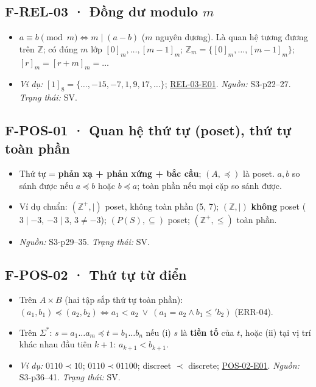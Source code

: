 \documentclass[
  10pt,
  twoside,openany]{book}
\providecommand{\tightlist}{%
  \setlength{\itemsep}{0pt}\setlength{\parskip}{0pt}}
\begin{document}
\hypertarget{F-REL-03}{%
\subsection{\texorpdfstring{F-REL-03 · Đồng dư modulo
\(m\)}{F-REL-03 · Đồng dư modulo m}}\label{F-REL-03}}

\begin{itemize}
\tightlist
\item
  \(a\equiv b\pmod m\Leftrightarrow m\mid(a-b)\) (\(m\) nguyên dương).
  Là quan hệ tương đương trên \(\mathbb Z\); có đúng \(m\) lớp
  \([0]_m,\dots,[m-1]_m\); \(\mathbb Z_m=\{[0]_m,\dots,[m-1]_m\}\);
  \([r]_m=[r+m]_m=\dots\)
\item
  \emph{Ví dụ:} \([1]_8=\{\dots,-15,-7,1,9,17,\dots\}\);
  \protect\hyperlink{REL-03-E01}{REL-03-E01}. \emph{Nguồn:} S3-p22--27.
  \emph{Trạng thái:} SV.
\end{itemize}

\hypertarget{F-POS-01}{%
\subsection{F-POS-01 · Quan hệ thứ tự (poset), thứ tự toàn
phần}\label{F-POS-01}}

\begin{itemize}
\tightlist
\item
  Thứ tự = \textbf{phản xạ + phản xứng + bắc cầu}; \((A,\preceq)\) là
  poset. \(a,b\) so sánh được nếu \(a\preceq b\) hoặc \(b\preceq a\);
  toàn phần nếu mọi cặp so sánh được.
\item
  Ví dụ chuẩn: \((\mathbb Z^+,\mid)\) poset, không toàn phần (5, 7);
  \((\mathbb Z,\mid)\) \textbf{không} poset (\(3\mid-3\), \(-3\mid3\),
  \(3\ne-3\)); \((P(S),\subseteq)\) poset; \((\mathbb Z^+,\le)\) toàn
  phần.
\item
  \emph{Nguồn:} S3-p29--35. \emph{Trạng thái:} SV.
\end{itemize}

\hypertarget{F-POS-02}{%
\subsection{F-POS-02 · Thứ tự từ điển}\label{F-POS-02}}

\begin{itemize}
\tightlist
\item
  Trên \(A\times B\) (hai tập sắp thứ tự toàn phần):
  \((a_1,b_1)\preceq(a_2,b_2)\Leftrightarrow a_1<a_2\ \vee\ (a_1=a_2\wedge b_1\le' b_2)\)
  (ERR-04).
\item
  Trên \(\Sigma^*\): \(s=a_1\dots a_m\preceq t=b_1\dots b_n\) nếu (i)
  \(s\) là \textbf{tiền tố} của \(t\), hoặc (ii) tại vị trí khác nhau
  đầu tiên \(k+1\): \(a_{k+1}<b_{k+1}\).
\item
  \emph{Ví dụ:} \(0110\prec10\); \(0110\prec01100\); discreet \(\prec\)
  discrete; \protect\hyperlink{POS-02-E01}{POS-02-E01}. \emph{Nguồn:}
  S3-p36--41. \emph{Trạng thái:} SV.
\end{itemize}
\end{document}
